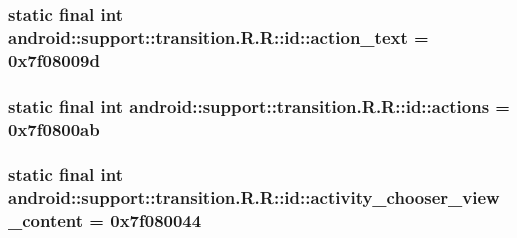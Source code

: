 \hypertarget{classandroid_1_1support_1_1transition_1_1_r_1_1id_b06bf95036a45d4d28f4a72fb417efe4}{
\subsubsection[{action\_\-text}]{\setlength{\rightskip}{0pt plus 5cm}static final int android::support::transition.R.R::id::action\_\-text = 0x7f08009d}}
\label{classandroid_1_1support_1_1transition_1_1_r_1_1id_b06bf95036a45d4d28f4a72fb417efe4}


\hypertarget{classandroid_1_1support_1_1transition_1_1_r_1_1id_5ea769757c5debf0c052070a354e6365}{
\subsubsection[{actions}]{\setlength{\rightskip}{0pt plus 5cm}static final int android::support::transition.R.R::id::actions = 0x7f0800ab}}
\label{classandroid_1_1support_1_1transition_1_1_r_1_1id_5ea769757c5debf0c052070a354e6365}


\hypertarget{classandroid_1_1support_1_1transition_1_1_r_1_1id_c9ef0056940a86737c2cb5876afcbb46}{
\subsubsection[{activity\_\-chooser\_\-view\_\-content}]{\setlength{\rightskip}{0pt plus 5cm}static final int android::support::transition.R.R::id::activity\_\-chooser\_\-view\_\-content = 0x7f080044}}
\label{classandroid_1_1support_1_1transition_1_1_r_1_1id_c9ef0056940a86737c2cb5876afcbb46}



